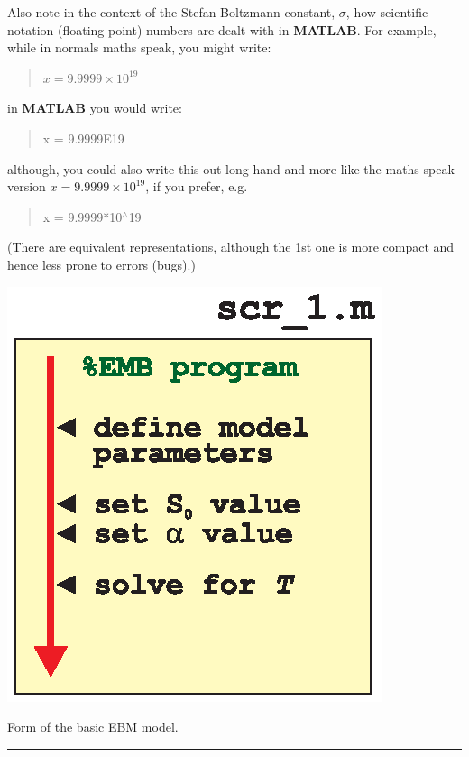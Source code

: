 \documentclass{tufte-book} %
\newenvironment{docspec}{\begin{quotation}\ttfamily\parskip0pt\parindent0pt\ignorespaces}{\end{quotation}}
\newenvironment{docspecnormal}{\begin{quotation}\ttfamily\normalsize\parskip0pt\parindent0pt\ignorespaces}{\end{quotation}}
\begin{document}
Also note in the context of the Stefan-Boltzmann constant, \(\sigma\), how scientific notation (floating point) numbers are dealt with in \textbf{MATLAB}. For example, while in normals maths speak, you might write:
\begin{docspecnormal}
\(x = 9.9999\times 10^{19}\)
\end{docspecnormal}
in \textbf{MATLAB} you would write:
\begin{docspec}
x = 9.9999E19
\end{docspec}
although, you could also write this out long-hand and more like the maths speak version \(x = 9.9999\times 10^{19}\), if you prefer, e.g.
\begin{docspec}
x = 9.9999*10\(^{\wedge}\)19
\end{docspec}
(There are equivalent representations, although the 1st one is more compact and hence less prone to errors (bugs).)

\begin{marginfigure}[0.0in]
\includegraphics[width=\linewidth]{ch8-schematic-scr1.eps}
\caption{Form of the basic EBM model.}
\label{fig:ch8-schematic-scr1}
\end{marginfigure}

\vspace{1mm}
\noindent\rule{4cm}{0.5pt}
\vspace{2mm}
\end{document}
